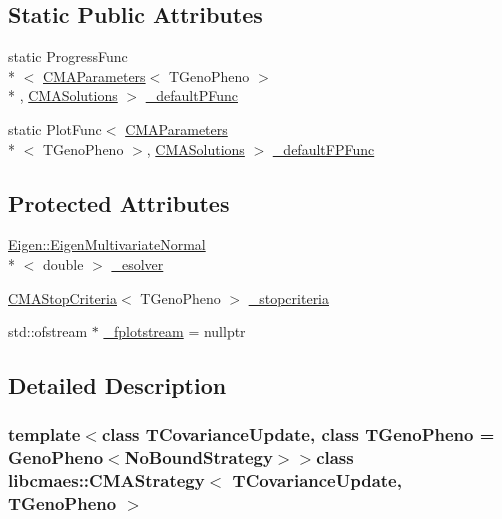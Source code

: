 \subsection*{Static Public Attributes}
\begin{DoxyCompactItemize}
\item 
static Progress\-Func\\*
$<$ \hyperlink{classlibcmaes_1_1CMAParameters}{C\-M\-A\-Parameters}$<$ T\-Geno\-Pheno $>$\\*
, \hyperlink{classlibcmaes_1_1CMASolutions}{C\-M\-A\-Solutions} $>$ \hyperlink{classlibcmaes_1_1CMAStrategy_af6d980c670eef47ee810645739999d5b}{\-\_\-default\-P\-Func}
\item 
static Plot\-Func$<$ \hyperlink{classlibcmaes_1_1CMAParameters}{C\-M\-A\-Parameters}\\*
$<$ T\-Geno\-Pheno $>$, \hyperlink{classlibcmaes_1_1CMASolutions}{C\-M\-A\-Solutions} $>$ \hyperlink{classlibcmaes_1_1CMAStrategy_a0fcdccd9451a2dc509ee651f664ac31f}{\-\_\-default\-F\-P\-Func}
\end{DoxyCompactItemize}
\subsection*{Protected Attributes}
\begin{DoxyCompactItemize}
\item 
\hyperlink{classEigen_1_1EigenMultivariateNormal}{Eigen\-::\-Eigen\-Multivariate\-Normal}\\*
$<$ double $>$ \hyperlink{classlibcmaes_1_1CMAStrategy_ad9d6fe34da1fb94315e86625210fe009}{\-\_\-esolver}
\item 
\hyperlink{classlibcmaes_1_1CMAStopCriteria}{C\-M\-A\-Stop\-Criteria}$<$ T\-Geno\-Pheno $>$ \hyperlink{classlibcmaes_1_1CMAStrategy_af7b7c6bf3018f5e3d57f2875215bba0c}{\-\_\-stopcriteria}
\item 
std\-::ofstream $\ast$ \hyperlink{classlibcmaes_1_1CMAStrategy_ad05db57e25a5aa2d4abe9cb030406236}{\-\_\-fplotstream} = nullptr
\end{DoxyCompactItemize}


\subsection{Detailed Description}
\subsubsection*{template$<$class T\-Covariance\-Update, class T\-Geno\-Pheno = Geno\-Pheno$<$\-No\-Bound\-Strategy$>$$>$class libcmaes\-::\-C\-M\-A\-Strategy$<$ T\-Covariance\-Update, T\-Geno\-Pheno $>$}

